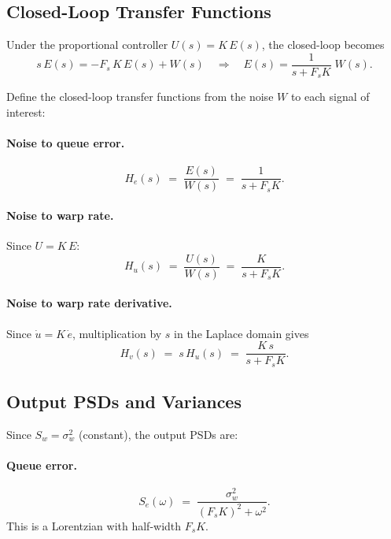 \documentclass[11pt, a4paper]{article}
\theoremstyle{definition}
\theoremstyle{plain}
\theoremstyle{remark}
\begin{document}
\subsection{Closed-Loop Transfer Functions}\label{sec:cl-tf}

Under the proportional controller $U(s) = K\,E(s)$, the
closed-loop becomes
\begin{equation}\label{eq:cl-E}
  s\,E(s) = -F_s\,K\,E(s) + W(s)
  \quad\Longrightarrow\quad
  E(s) = \frac{1}{s + F_s K}\;W(s).
\end{equation}

Define the closed-loop transfer functions from the noise $W$ to
each signal of interest:

\paragraph{Noise to queue error.}
\begin{equation}\label{eq:tf-e}
  H_e(s) \;=\; \frac{E(s)}{W(s)} \;=\; \frac{1}{s + F_s K}.
\end{equation}

\paragraph{Noise to warp rate.}
Since $U = K\,E$:
\begin{equation}\label{eq:tf-u}
  H_u(s) \;=\; \frac{U(s)}{W(s)} \;=\; \frac{K}{s + F_s K}.
\end{equation}

\paragraph{Noise to warp rate derivative.}
Since $\dot{u} = K\,\dot{e}$, multiplication by $s$ in the
Laplace domain gives
\begin{equation}\label{eq:tf-v}
  H_v(s) \;=\; s\,H_u(s) \;=\; \frac{K\,s}{s + F_s K}.
\end{equation}

\subsection{Output PSDs and Variances}\label{sec:output-psd}

Since $S_w = \sigma_w^2$ (constant), the output PSDs are:

\paragraph{Queue error.}
\begin{equation}\label{eq:psd-e}
  S_e(\omega) \;=\; \frac{\sigma_w^2}{(F_s K)^2 + \omega^2}.
\end{equation}
This is a Lorentzian with half-width $F_s K$.
\end{document}
